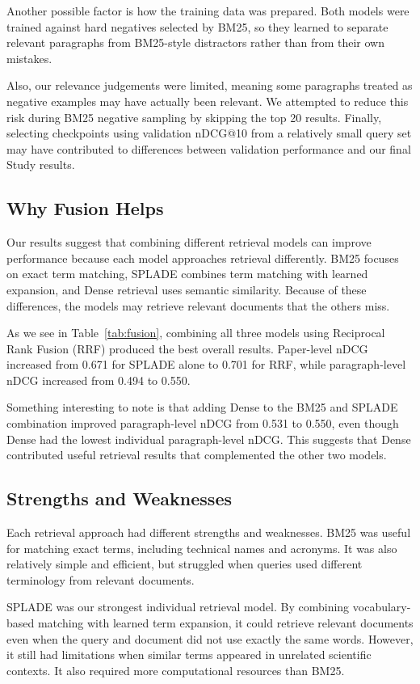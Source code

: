 \documentclass[sigconf,nonacm]{acmart}
\begin{document}
Another possible factor is how the training data was prepared. Both
models were trained against hard negatives selected by BM25, so they
learned to separate relevant paragraphs from BM25-style distractors
rather than from their own mistakes.

Also, our relevance judgements were limited, meaning some paragraphs
treated as negative examples may have actually been relevant. We attempted
to reduce this risk during BM25 negative sampling by skipping the top 20
results. Finally, selecting checkpoints using validation nDCG@10 from a 
relatively small query set may have contributed to differences between
validation performance and our final Study results.

\subsection{Why Fusion Helps}
\label{sec:why-fusion}
Our results suggest that combining different retrieval models can improve
performance because each model approaches retrieval differently. BM25 focuses
on exact term matching, SPLADE combines term matching with learned expansion, 
and Dense retrieval uses semantic similarity. Because of these differences, 
the models may retrieve relevant documents that the others miss. 

As we see in Table~\ref{tab:fusion}, combining all three models using 
Reciprocal Rank Fusion (RRF) produced the best overall results. Paper-level
nDCG increased from 0.671 for SPLADE alone to 0.701 for RRF, while
paragraph-level nDCG increased from 0.494 to 0.550.

Something interesting to note is that adding Dense to the BM25 and SPLADE
combination improved paragraph-level nDCG from 0.531 to 0.550, even though Dense
had the lowest individual paragraph-level nDCG. This suggests that Dense
contributed useful retrieval results that complemented the other two models.

\subsection{Strengths and Weaknesses}
\label{sec:strengths}
Each retrieval approach had different strengths and weaknesses. BM25 was
useful for matching exact terms, including technical names and acronyms.
It was also relatively simple and efficient, but struggled when queries 
used different terminology from relevant documents. 

SPLADE was our strongest individual retrieval model. By combining
vocabulary-based matching with learned term expansion, it could retrieve
relevant documents even when the query and document did not use exactly
the same words. However, it still had limitations when similar terms
appeared in unrelated scientific contexts. It also required more
computational resources than BM25. 
\end{document}
